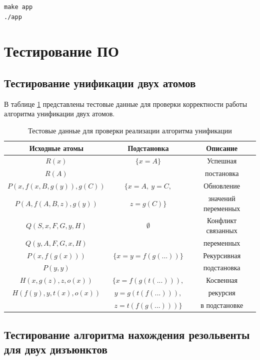 \begin{verbatim}
make app
./app
\end{verbatim}

\clearpage

\section{Тестирование ПО}

\subsection{Тестирование унификации двух атомов}

В таблице \ref{tab:unify} представлены тестовые данные для проверки корректности работы алгоритма унификации двух атомов.

\begin{table}[h!]
    \centering
    \caption{Тестовые данные для проверки реализации алгоритма унификации}
    \label{tab:unify}
    \begin{tabular}{|c|c|c|}
        \hline
        Исходные атомы & Подстановка & Описание \\
        \hline
        \hline
        $R(x)$ & $\{x=A\}$ & Успешная \\
        $R(A)$ & & постановка \\
        \hline
        $P(x, f(x, B, g(y)), g(C))$ & $\{x=A,~y=C,$ & Обновление \\
        $P(A, f(A, B, z), g(y))$ & $z=g(C)\}$ & значений переменных \\
        \hline
        $Q(S, x, F, G, y, H)$ & $\emptyset$ & Конфликт связанных \\
        $Q(y, A, F, G, x, H)$ & & переменных \\
        \hline
        $P(x, f(g(x)))$ & $\{x=y=f(g(...))\}$ & Рекурсивная \\
        $P(y, y)$ & & подстановка \\
        \hline
        $H(x, g(z), z, o(x))$ & $\{x=f(g(t(...))),$ & Косвенная \\
        $H(f(y), y, t(x), o(x))$ & $y=g(t(f(...))),$ & рекурсия \\
        & $z=t(f(g(...)))\}$ & в подстановке \\
        \hline 
    \end{tabular}
\end{table}

\subsection{Тестирование алгоритма нахождения резольвенты для двух дизъюнктов}

